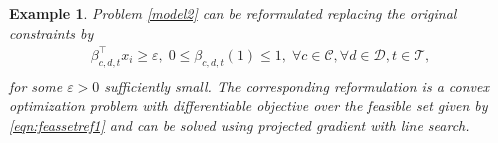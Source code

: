 \documentclass[article]{jss}
\newtheorem{example}{Example}[section]
\begin{document}
{\begin{example}
Problem \eqref{model2} can be reformulated
replacing the original constraints
by
\begin{equation}
\label{eqn:feassetref1}
\begin{array}{l}
\beta_{c,d,t}^{\top} x_i  \geq\varepsilon,\; 0 \leq \beta_{c,d,t}(1) \leq 1,\;
\forall c \in \mathcal{C}, \forall d \in \mathcal{D}, t \in \mathcal{T},\\
\end{array}
\end{equation}
for some $\varepsilon>0$ sufficiently small.
The corresponding reformulation is a convex
optimization problem with differentiable
objective over the feasible set given by
\eqref{eqn:feassetref1} and can 
be  solved 
using projected gradient
with line search.
\end{example}
}
\end{document}
